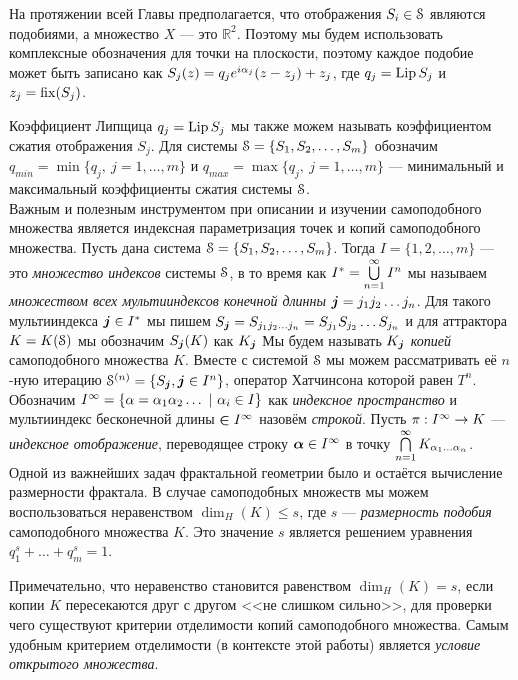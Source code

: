 На протяжении всей Главы предполагается, что отображения $S_i\in {\EuScript S}$ являются подобиями, а множество $X$ --- это $\mathbb{R}^2$.
Поэтому мы будем использовать комплексные обозначения для точки на плоскости, поэтому каждое подобие может быть записано как $S_j(z)=q_j e^{i\alpha_j}(z-z_j)+z_j$, где $q_j=\mathop{\rm Lip} \nolimits S_j$ и $z_j=\mathop{\rm fix} \nolimits(S_j)$.

Коэффициент Липщица $q_j=\mathop{\rm Lip} \nolimits S_j$ мы также можем называть коэффициентом сжатия отображения $S_j$.
Для системы ${\EuScript S}=\{S_1, S_2, \ldots, S_m\}$ обозначим $q_{min}=\min\{q_j,\ j=1,\ldots,m\}$ и $q_{max}=\max\{q_j,\ j=1,\ldots,m\}$ --- минимальный и максимальный коэффициенты сжатия системы ${\EuScript S}$.\\

Важным и полезным инструментом при описании и изучении самоподобного множества является индексная параметризация точек и копий самоподобного множества.
Пусть дана система ${\EuScript S}=\{S_1, S_2, \ldots, S_m\}$.
Тогда $I=\{1,2,\ldots,m\}$ --- это {\em множество индексов} системы ${\EuScript S}$, в то время как $I^*=\bigcup\limits_{n=1}^\infty I^n$ мы называем {\em множеством всех мультииндексов конечной длинны} ${\bm{j}}=j_1 j_2 \ldots j_n$.
Для такого мультииндекса ${\bm{j}}\in I^*$ мы пишем $S_{\bm{j}}=S_{j_1j_2\ldots j_n}=S_{j_1}S_{j_2}\ldots S_{j_n}$ и для аттрактора $K=K({\EuScript S})$ мы обозначим $S_{\bm{j}}(K)$ как $K_{\bm{j}}$
Мы будем называть $K_{\bm{j}}$ {\em копией} самоподобного множества $K$.
Вместе с системой ${\EuScript S}$ мы можем рассматривать её $n$-ную итерацию ${\EuScript S}^{(n)}=\{S_{\bm{j}}, {\bm{j}}\in I^n\}$, оператор Хатчинсона которой равен $T^n$.\\
 
Обозначим $I^{\infty}=\{{\bf \alpha}=\alpha_1\alpha_2\ldots\ |\ \alpha_i\in I\}$ как {\em индексное пространство} и мультииндекс бесконечной длины $\bm\in I^{\infty}$ назовём {\em строкой}.
Пусть $\pi:I^{\infty}\rightarrow K$ --- {\em индексное отображение}, переводящее строку ${\bm{\alpha}}\in I^{\infty}$ в точку $\bigcap\limits_{n=1}^\infty K_{\alpha_1\ldots\alpha_n}$.\\

Одной из важнейших задач фрактальной геометрии было и остаётся вычисление размерности фрактала.
В случае самоподобных множеств мы можем воспользоваться неравенством $\dim_H(K)\leq s$, где $s$ --- {\em размерность подобия} самоподобного множества $K$.
Это значение $s$ является решением уравнения $q_1^s+\ldots+q_m^s=1$.

Примечательно, что неравенство становится равенством $\dim_H(K)=s$, если копии $K$ пересекаются друг с другом <<не слишком сильно>>, для проверки чего существуют критерии отделимости копий самоподобного множества.
Самым удобным критерием отделимости (в контексте этой работы) является {\em условие открытого множества}. 

